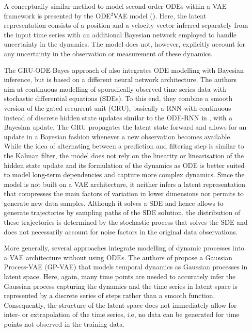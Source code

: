 A conceptually similar method to model second-order ODEs within a VAE framework is presented by the ODE$^2$VAE model (\cite{Yildiz2019}). Here, the latent representation consists of a position and a velocity vector inferred separately from the input time series with an additional Bayesian network employed to handle uncertainty in the dynamics. The model does not, however, explicitly account for any uncertainty in the observation or measurement of these dynamics. 

The GRU-ODE-Bayes approach of \cite{Brouwer2019} also integrates ODE modelling with Bayesian inference, but is based on a different neural network architecture. The authors aim at continuous modelling of sporadically observed time series data with stochastic differential equations (SDEs). To this end, they combine a smooth version of the gated recurrent unit (GRU), basically a RNN with continuous instead of discrete hidden state updates similar to the ODE-RNN in \cite{Rubanova2019}, with a Bayesian update. The GRU propagates the latent state forward and allows for an update in a Bayesian fashion whenever a new observation becomes available. While the idea of alternating between a prediction and filtering step is similar to the Kalman filter, the model does not rely on the linearity or linearisation of the hidden state update and its formulation of the dynamics as ODE is better suited to model long-term dependencies and capture more complex dynamics. Since the model is not built on a VAE architecture, it neither infers a latent representation that compresses the main factors of variation in lower dimensions nor permits to generate new data samples. Although it solves a SDE and hence allows to generate trajectories by sampling paths of the SDE solution, the distribution of these trajectories is determined by the stochastic process that solves the SDE and does not necessarily account for noise factors in the original data observations.

More generally, several approaches integrate modelling of dynamic processes into a VAE architecture without using ODEs. The authors of \cite{Fortuin2019} propose a Gaussian Process-VAE (GP-VAE) that models temporal dynamics as Gaussian processes in latent space. Here, again, many time points are needed to accurately infer the Gaussian process capturing the dynamics and the time series in latent space is represented by a discrete series of steps rather than a smooth function. Consequently, the structure of the latent space does not immediately allow for inter- or extrapolation of the time series, i.e, no data can be generated for time points not observed in the training data. 

